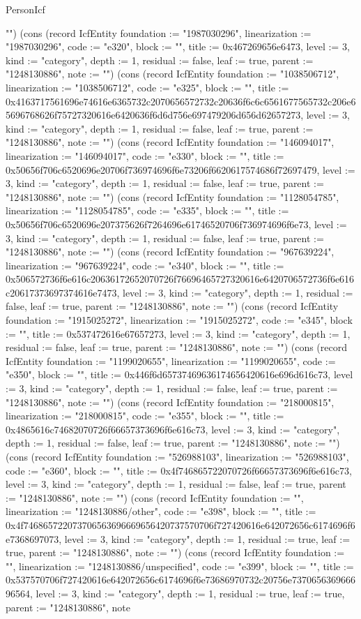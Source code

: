 \begin{lexlean}{PersonIcf}
\begin{semanticmodule}
{""}) (cons (record IcfEntity {foundation := "1987030296", linearization := "1987030296", code := "e320", block := "", title := 0x467269656e6473, level := 3, kind := "category", depth := 1, residual := false, leaf := true, parent := "1248130886", note := ""}) (cons (record IcfEntity {foundation := "1038506712", linearization := "1038506712", code := "e325", block := "", title := 0x4163717561696e74616e6365732c2070656572732c20636f6c6c6561677565732c206e65696768626f75727320616e6420636f6d6d756e697479206d656d62657273, level := 3, kind := "category", depth := 1, residual := false, leaf := true, parent := "1248130886", note := ""}) (cons (record IcfEntity {foundation := "146094017", linearization := "146094017", code := "e330", block := "", title := 0x50656f706c6520696e20706f736974696f6e73206f6620617574686f72697479, level := 3, kind := "category", depth := 1, residual := false, leaf := true, parent := "1248130886", note := ""}) (cons (record IcfEntity {foundation := "1128054785", linearization := "1128054785", code := "e335", block := "", title := 0x50656f706c6520696e207375626f7264696e61746520706f736974696f6e73, level := 3, kind := "category", depth := 1, residual := false, leaf := true, parent := "1248130886", note := ""}) (cons (record IcfEntity {foundation := "967639224", linearization := "967639224", code := "e340", block := "", title := 0x506572736f6e616c20636172652070726f76696465727320616e6420706572736f6e616c20617373697374616e7473, level := 3, kind := "category", depth := 1, residual := false, leaf := true, parent := "1248130886", note := ""}) (cons (record IcfEntity {foundation := "1915025272", linearization := "1915025272", code := "e345", block := "", title := 0x537472616e67657273, level := 3, kind := "category", depth := 1, residual := false, leaf := true, parent := "1248130886", note := ""}) (cons (record IcfEntity {foundation := "1199020655", linearization := "1199020655", code := "e350", block := "", title := 0x446f6d65737469636174656420616e696d616c73, level := 3, kind := "category", depth := 1, residual := false, leaf := true, parent := "1248130886", note := ""}) (cons (record IcfEntity {foundation := "218000815", linearization := "218000815", code := "e355", block := "", title := 0x4865616c74682070726f66657373696f6e616c73, level := 3, kind := "category", depth := 1, residual := false, leaf := true, parent := "1248130886", note := ""}) (cons (record IcfEntity {foundation := "526988103", linearization := "526988103", code := "e360", block := "", title := 0x4f746865722070726f66657373696f6e616c73, level := 3, kind := "category", depth := 1, residual := false, leaf := true, parent := "1248130886", note := ""}) (cons (record IcfEntity {foundation := "", linearization := "1248130886/other", code := "e398", block := "", title := 0x4f746865722073706563696669656420737570706f727420616e642072656c6174696f6e7368697073, level := 3, kind := "category", depth := 1, residual := true, leaf := true, parent := "1248130886", note := ""}) (cons (record IcfEntity {foundation := "", linearization := "1248130886/unspecified", code := "e399", block := "", title := 0x537570706f727420616e642072656c6174696f6e73686970732c20756e737065636966696564, level := 3, kind := "category", depth := 1, residual := true, leaf := true, parent := "1248130886", note }
\end{semanticmodule}
\end{lexlean}
